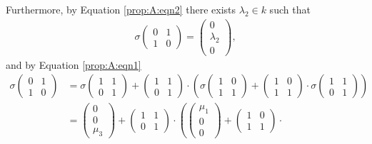 Furthermore, by Equation \ref{prop:A:eqn2} there exists $\lambda_2\in k$ such that
\begin{align*}
	\sigma\left(\begin{matrix}0 & 1\\1 & 0\end{matrix}\right) = \left(\begin{matrix}0 \\ \lambda_2 \\ 0 \end{matrix}\right),
\end{align*}
and by Equation \ref{prop:A:eqn1}
\begin{align*}
\sigma\left(\begin{matrix}0 & 1 \\ 1 & 0\end{matrix}\right)
&=
	\sigma
		\left(\begin{matrix} 1 & 1\\ 0 & 1\end{matrix}\right) +
		\left(\begin{matrix} 1 & 1\\ 0 & 1\end{matrix}\right)\cdot
		\left(
		\sigma
		\left(\begin{matrix} 1 & 0\\ 1 & 1\end{matrix}\right) +
		\left(\begin{matrix} 1 & 0\\ 1 & 1\end{matrix}\right)\cdot
		\sigma\left(\begin{matrix} 1 & 1\\ 0 & 1\end{matrix}\right)
		\right)
	\\
&=
		\left(\begin{matrix} 0 \\ 0 \\ \mu_3 \end{matrix}\right) +
		\left(\begin{matrix} 1 & 1\\ 0 & 1\end{matrix}\right)\cdot
		\left(
		\left(\begin{matrix} \mu_1 \\ 0 \\ 0\end{matrix}\right) +
		\left(\begin{matrix} 1 & 0\\ 1 & 1\end{matrix}\right)\cdot

\end{align*}
